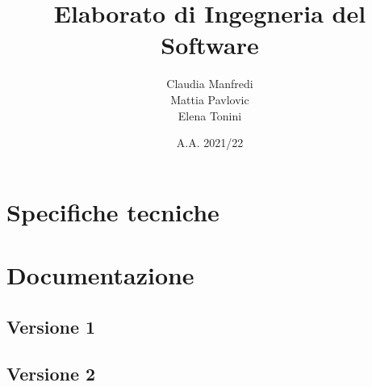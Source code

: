 \documentclass{report}
\title{Elaborato di Ingegneria del Software}
\author{Claudia Manfredi\\Mattia Pavlovic\\Elena Tonini}
\date{A.A. 2021/22}
\begin{document}
\maketitle
\tableofcontents

\chapter{Specifiche tecniche}


\chapter{Documentazione}

\section{Versione 1}




\cleardoublepage
\section{Versione 2}



\end{document}
